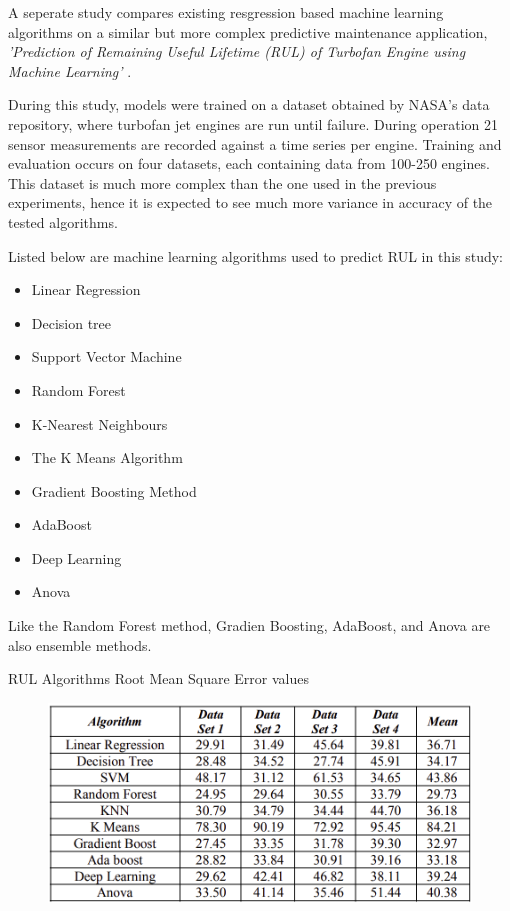 \documentclass[a4paper,12pt]{report}
\begin{document}
A seperate study compares existing resgression based machine learning algorithms on a similar but more complex predictive maintenance application,
\textit{'Prediction of Remaining Useful Lifetime (RUL) of Turbofan Engine using Machine Learning'} \cite{RUL}.

During this study, models were trained on a dataset obtained by NASA's data repository, where turbofan jet engines are run until failure.
During operation 21 sensor measurements are recorded against a time series per engine. Training and evaluation occurs on four datasets, each containing data from 100-250 engines. 
This dataset is much more complex than the one used in the previous experiments,
hence it is expected to see much more variance in accuracy of the tested algorithms. 

Listed below are machine learning algorithms used to predict RUL in this study:
\begin{itemize}
    \item Linear Regression
    \item Decision tree
    \item Support Vector Machine
    \item Random Forest
    \item K-Nearest Neighbours
    \item The K Means Algorithm
    \item Gradient Boosting Method
    \item AdaBoost
    \item Deep Learning
    \item Anova 
\end{itemize}
\bigskip

Like the Random Forest method, Gradien Boosting, AdaBoost, and Anova are also ensemble methods.


\begin{table}[h]
    \bigskip
    \caption{RUL Algorithms Root Mean Square Error values\cite{RUL}}
    \begin{figure}[H]
        \includegraphics[scale=0.4]{RUL_results.png}
        \centering
    \end{figure}
    \label{table:RMSE}
\end{table}
\end{document}
